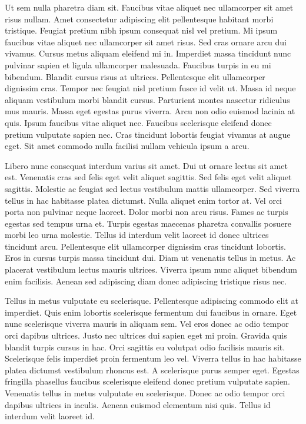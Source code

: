 \documentclass[11pt,a4paper]{article}
\begin{document}
Ut sem nulla pharetra diam sit. Faucibus vitae aliquet nec ullamcorper sit amet risus nullam. Amet consectetur adipiscing elit pellentesque habitant morbi tristique. Feugiat pretium nibh ipsum consequat nisl vel pretium. Mi ipsum faucibus vitae aliquet nec ullamcorper sit amet risus. Sed cras ornare arcu dui vivamus. Cursus metus aliquam eleifend mi in. Imperdiet massa tincidunt nunc pulvinar sapien et ligula ullamcorper malesuada. Faucibus turpis in eu mi bibendum. Blandit cursus risus at ultrices. Pellentesque elit ullamcorper dignissim cras. Tempor nec feugiat nisl pretium fusce id velit ut. Massa id neque aliquam vestibulum morbi blandit cursus. Parturient montes nascetur ridiculus mus mauris. Massa eget egestas purus viverra. Arcu non odio euismod lacinia at quis. Ipsum faucibus vitae aliquet nec. Faucibus scelerisque eleifend donec pretium vulputate sapien nec. Cras tincidunt lobortis feugiat vivamus at augue eget. Sit amet commodo nulla facilisi nullam vehicula ipsum a arcu.

Libero nunc consequat interdum varius sit amet. Dui ut ornare lectus sit amet est. Venenatis cras sed felis eget velit aliquet sagittis. Sed felis eget velit aliquet sagittis. Molestie ac feugiat sed lectus vestibulum mattis ullamcorper. Sed viverra tellus in hac habitasse platea dictumst. Nulla aliquet enim tortor at. Vel orci porta non pulvinar neque laoreet. Dolor morbi non arcu risus. Fames ac turpis egestas sed tempus urna et. Turpis egestas maecenas pharetra convallis posuere morbi leo urna molestie. Tellus id interdum velit laoreet id donec ultrices tincidunt arcu. Pellentesque elit ullamcorper dignissim cras tincidunt lobortis. Eros in cursus turpis massa tincidunt dui. Diam ut venenatis tellus in metus. Ac placerat vestibulum lectus mauris ultrices. Viverra ipsum nunc aliquet bibendum enim facilisis. Aenean sed adipiscing diam donec adipiscing tristique risus nec.

Tellus in metus vulputate eu scelerisque. Pellentesque adipiscing commodo elit at imperdiet. Quis enim lobortis scelerisque fermentum dui faucibus in ornare. Eget nunc scelerisque viverra mauris in aliquam sem. Vel eros donec ac odio tempor orci dapibus ultrices. Justo nec ultrices dui sapien eget mi proin. Gravida quis blandit turpis cursus in hac. Orci sagittis eu volutpat odio facilisis mauris sit. Scelerisque felis imperdiet proin fermentum leo vel. Viverra tellus in hac habitasse platea dictumst vestibulum rhoncus est. A scelerisque purus semper eget. Egestas fringilla phasellus faucibus scelerisque eleifend donec pretium vulputate sapien. Venenatis tellus in metus vulputate eu scelerisque. Donec ac odio tempor orci dapibus ultrices in iaculis. Aenean euismod elementum nisi quis. Tellus id interdum velit laoreet id.
\end{document}
